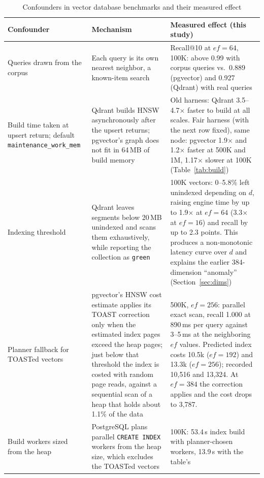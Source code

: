 \documentclass[sigconf, nonacm]{acmart}
\begin{document}
\begin{table}[t]
  \caption{Confounders in vector database benchmarks and their measured effect}
  \label{tab:confounders}
  \small
  \begin{tabular}{p{}p{}p{}}
    \toprule
    Confounder & Mechanism & Measured effect (this study) \\
    \midrule
    Queries drawn from the corpus &
      Each query is its own nearest neighbor, a known-item search &
      Recall@10 at $ef=64$, 100K: above 0.99 with corpus queries vs.\ 0.889
      (pgvector) and 0.927 (Qdrant) with real queries \\
    Build time taken at upsert return; default \texttt{maintenance\_work\_mem} &
      Qdrant builds HNSW asynchronously after the upsert returns; pgvector's graph does
      not fit in 64\,MB of build memory &
      Old harness: Qdrant 3.5--4.7$\times$ faster to build at all scales. Fair harness
      (with the next row fixed), same node: pgvector 1.9$\times$ and 1.2$\times$ faster at
      500K and 1M, 1.17$\times$ slower at 100K (Table~\ref{tab:build}) \\
    Indexing threshold &
      Qdrant leaves segments below 20\,MB unindexed and scans them exhaustively, while
      reporting the collection as \texttt{green} &
      100K vectors: 0--5.8\% left unindexed depending on $d$, raising engine time by up to
      1.9$\times$ at $ef=64$ (3.3$\times$ at $ef=16$) and recall by up to
      2.3 points. This produces a non-monotonic latency curve over $d$ and explains the
      earlier 384-dimension ``anomaly'' (Section~\ref{sec:dims}) \\
    Planner fallback for TOASTed vectors &
      pgvector's HNSW cost estimate applies its TOAST correction only when the estimated
      index pages exceed the heap pages; just below that threshold the index is costed
      with random page reads, against a sequential scan of a heap that holds about 1.1\%
      of the data &
      500K, $ef=256$: parallel exact scan, recall 1.000 at 890\,ms per query
      against 3--5\,ms at the neighboring $ef$ values. Predicted index costs 10.5k
      ($ef=192$) and 13.3k ($ef=256$); recorded 10{,}516 and 13{,}324. At $ef=384$ the
      correction applies and the cost drops to 3{,}787. \\
    Build workers sized from the heap &
      PostgreSQL plans parallel \texttt{CREATE INDEX} workers from the heap size, which
      excludes the TOASTed vectors &
      100K: 53.4\,s index build with planner-chosen workers, 13.9\,s with the table's

\end{tabular}
\end{table}
\end{document}
